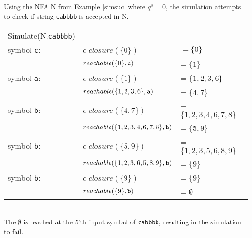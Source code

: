 \begin{myex}
Using the NFA N from Example \ref{simsuc} where $q^s=0$, the simulation attempts to check if string {\tt cabbbb} is accepted in N.\\
\begin{tabular}{l l l}
Simulate(N,{\tt cabbbb}) & & \\
symbol {\tt c}: & $\epsilon$-$closure(\{0\})$ &$ = \{0\}$\\
&$reachable(\{0\},{\tt c})$& = $\{1\}$\\
symbol {\tt a}: & $\epsilon$-$closure(\{1\})$& = $\{1,2,3,6\}$\\
&$reachable(\{1,2,3,6\},{\tt a})$ & = $\{4,7\}$\\
symbol {\tt b}: & $\epsilon$-$closure(\{4,7\})$& = $\{1,2,3,4,6,7,8\}$\\
&$reachable(\{1,2,3,4,6,7,8\},{\tt b})$ &= $\{5,9\}$\\
symbol {\tt b}: & $\epsilon$-$closure(\{5,9\})$& = $\{1,2,3,5,6,8,9\}$\\
&$reachable(\{1,2,3,6,5,8,9\},{\tt b})$ &= $\{9\}$\\
symbol {\tt b}: & $\epsilon$-$closure(\{9\})$& = $\{9\}$\\
&$reachable(\{9\},{\tt b})$ &= $\emptyset$\\
\end{tabular}\\
The $\emptyset$ is reached at the 5'th input symbol of {\tt cabbbb}, resulting in the simulation to fail. 
\end{myex}
